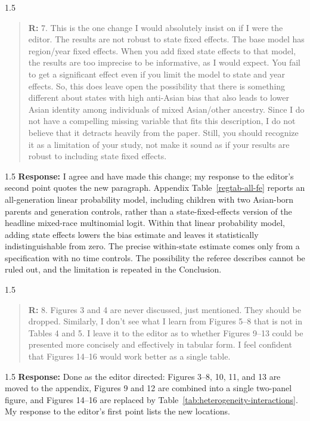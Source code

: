 \documentclass[12pt,english]{article}
\newcommand{\rrxspc}{1.5}
\begin{document}
\begin{refsection}
    \begin{spacing}{\rrxspc}
            \begin{quotation}
                \textbf{R: } 7. This is the one change I would absolutely insist on if I were the editor. The results are not robust to state fixed effects. The base model has region/year fixed effects. When you add fixed state effects to that model, the results are too imprecise to be informative, as I would expect. You fail to get a significant effect even if you limit the model to state and year effects. So, this does leave open the possibility that there is something different about states with high anti-Asian bias that also leads to lower Asian identity among individuals of mixed Asian/other ancestry. Since I do not have a compelling missing variable that fits this description, I do not believe that it detracts heavily from the paper. Still, you should recognize it as a limitation of your study, not make it sound as if your results are robust to including state fixed effects.
            \end{quotation}
    \end{spacing}
    \begin{spacing}{\rrxspc}
        \textbf{Response:} I agree and have made this change; my response to the editor's second point quotes the new paragraph. Appendix Table~\ref{regtab-all-fe} reports an all-generation linear probability model, including children with two Asian-born parents and generation controls, rather than a state-fixed-effects version of the headline mixed-race multinomial logit. Within that linear probability model, adding state effects lowers the bias estimate and leaves it statistically indistinguishable from zero. The precise within-state estimate comes only from a specification with no time controls. The possibility the referee describes cannot be ruled out, and the limitation is repeated in the Conclusion.
    \end{spacing}

    \begin{spacing}{\rrxspc}
            \begin{quotation}
                \textbf{R: } 8. Figures 3 and 4 are never discussed, just mentioned. They should be dropped. Similarly, I don't see what I learn from Figures 5--8 that is not in Tables 4 and 5. I leave it to the editor as to whether Figures 9--13 could be presented more concisely and effectively in tabular form. I feel confident that Figures 14--16 would work better as a single table.
            \end{quotation}
    \end{spacing}
    \begin{spacing}{\rrxspc}
        \textbf{Response:} Done as the editor directed: Figures 3--8, 10, 11, and 13 are moved to the appendix, Figures 9 and 12 are combined into a single two-panel figure, and Figures 14--16 are replaced by Table~\ref{tab:heterogeneity-interactions}. My response to the editor's first point lists the new locations.
    \end{spacing}


\end{refsection}
\end{document}
